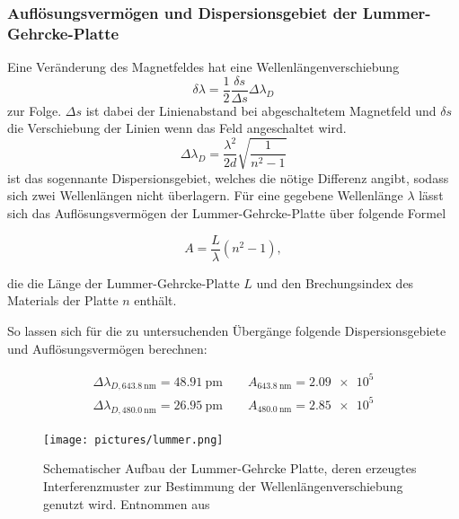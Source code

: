         \subsubsection*{Auflösungsvermögen und Dispersionsgebiet der Lummer-Gehrcke-Platte}
            Eine Veränderung des Magnetfeldes hat eine Wellenlängenverschiebung
            \begin{equation}
                \delta\lambda=\frac{1}{2}\frac{\delta s}{\Delta s}\Delta\lambda_D
            \end{equation}
            zur Folge. $\Delta s$ ist dabei der Linienabstand bei abgeschaltetem Magnetfeld und
            $\delta s$ die Verschiebung der Linien wenn das Feld angeschaltet wird.
            \begin{equation}
                \Delta\lambda_D=\frac{\lambda^2}{2d}\sqrt{\frac{1}{n^2-1}}
                \label{eqn:delta_lambda}
            \end{equation}
            ist das sogennante Dispersionsgebiet, welches die nötige Differenz angibt,
            sodass sich zwei Wellenlängen nicht überlagern. Für eine gegebene Wellenlänge $\lambda$ lässt sich das Auflösungsvermögen der Lummer-Gehrcke-Platte über folgende Formel
            
            \begin{equation}
                A = \frac{L}{\lambda} (n^2 - 1),
                \label{eqn:auflösung}
            \end{equation}

            die die Länge der Lummer-Gehrcke-Platte $L$ und den Brechungsindex des Materials der Platte $n$ enthält.

            So lassen sich für die zu untersuchenden Übergänge folgende Dispersionsgebiete und Auflösungsvermögen berechnen:
            
            \begin{align*}
                \Delta\lambda_{D, \SI{643.8}{\nano\metre}} = \SI{48.91}{\pico\metre}  \qquad A_{\SI{643.8}{\nano\metre}} = \num{2.09e5} \\
                \Delta\lambda_{D, \SI{480.0}{\nano\metre}} = \SI{26.95}{\pico\metre}  \qquad A_{\SI{480.0}{\nano\metre}} = \num{2.85e5}
            \end{align*}




        \begin{figure}[h]
            \centering
            \texttt{[image: pictures/lummer.png]}
            \caption{Schematischer Aufbau der Lummer-Gehrcke Platte, deren erzeugtes Interferenzmuster zur Bestimmung der Wellenlängenverschiebung genutzt wird. Entnommen aus \cite{tu_dortmund_versuchsanleitung_2021-5}}
            \label{fig:lummer}
        \end{figure}

